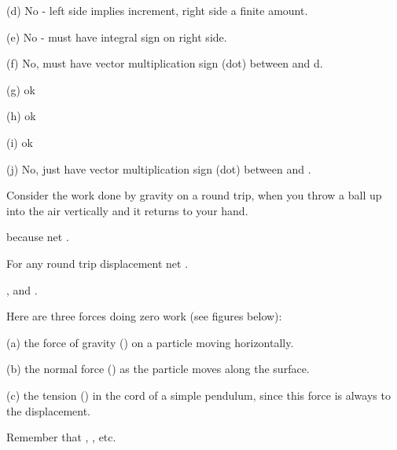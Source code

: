 {\begin{two-digit-list}
\item []   (d) No - left side implies increment, right side a finite amount.
\item []   (e) No - must have integral sign on right side.
\item []   (f) No, must have vector multiplication sign (dot) between
            and d.
\item []   (g) ok
\item []   (h) ok
\item []   (i) ok
\item []   (j) No, just have vector multiplication sign (dot) between
            and .
\item [53.] Consider the work done by gravity on a round trip, when you throw
           a ball up into the air vertically and it returns to your hand.
\item []   
\item []   
           because net .
\item []   For any round trip displacement net .
\item [54.] ,  and .
\item []   
\item []   Here are three forces doing zero work (see figures below):
\item []   (a) the force of gravity () on a particle moving
           horizontally.
\item []   (b) the normal force () as the particle moves along the
           surface.
\item []   (c) the tension () in the cord of a simple pendulum,
           since this force is always \m{\perp} to the displacement.

\item [55.] Remember that ,
           , etc.


\end{two-digit-list}}
